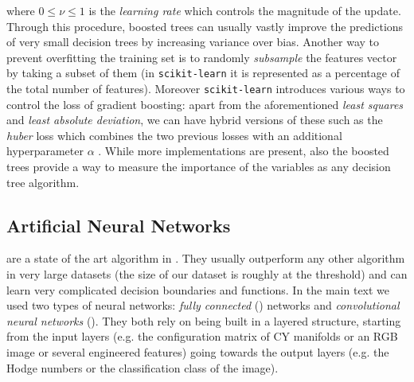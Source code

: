 where $0 \le \nu \le 1$ is the \textit{learning rate} which controls the magnitude of the update.
Through this procedure, boosted trees can usually vastly improve the predictions of very small decision trees by increasing variance over bias.
Another way to prevent overfitting the training set is to randomly \textit{subsample} the features vector by taking a subset of them (in \texttt{scikit-learn} it is represented as a percentage of the total number of features).
Moreover \texttt{scikit-learn} introduces various ways to control the loss of gradient boosting: apart from the aforementioned \textit{least squares} and \textit{least absolute deviation}, we can have hybrid versions of these such as the \textit{huber} loss which combines the two previous losses with an additional hyperparameter $\alpha$ \cite{Fawcett:2001:UsingRuleSets}. While more implementations are present, also the boosted trees provide a way to measure the importance of the variables as any decision tree algorithm.


\subsection{Artificial Neural Networks}
\label{sec:app:nn}

\ann are a state of the art algorithm in \ml.
They usually outperform any other algorithm in very large datasets (the size of our dataset is roughly at the threshold) and can learn very complicated decision boundaries and functions.\footnotemark{}
In the main text we used two types of neural networks: \textit{fully connected} (\fc) networks and \textit{convolutional neural networks} (\cnn).
They both rely on being built in a layered structure, starting from the input layers (e.g. the configuration matrix of CY manifolds or an RGB image or several engineered features) going towards the output layers (e.g. the Hodge numbers or the classification class of the image).

